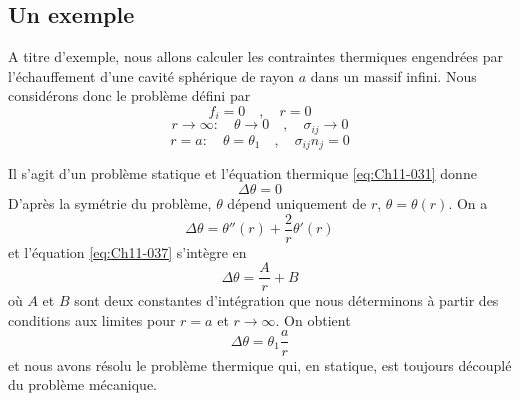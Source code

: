 \subsection{Un exemple}\label{ssec:Ch11-2.2}
A titre d'exemple, nous allons calculer les contraintes thermiques engendrées par l'échauffement d'une cavité sphérique de rayon $a$ dans un mas­sif infini. Nous considérons donc le problème défini par 
\begin{equation}
    f_i = 0 \quad,\quad r=0
    \label{eq:Ch11-034}
\end{equation}
\begin{equation}
    r \rightarrow \infty: \quad \theta \rightarrow 0 \quad,\quad \sigma_{ij}\rightarrow 0
    \label{eq:Ch11-035}
\end{equation}
\begin{equation}
    r =a: \quad \theta=\theta_1 \quad,\quad \sigma_{ij}n_j = 0
    \label{eq:Ch11-036}
\end{equation}

Il s'agit d'un problème statique et l'équation thermique \eqref{eq:Ch11-031} donne 
\begin{equation}
    \Delta \theta = 0
    \label{eq:Ch11-037}
\end{equation}
D'après la symétrie du problème, $\theta$ dépend uniquement de $r$, $\theta=\theta(r)$. On a 
\begin{equation}
    \Delta \theta = \theta''(r) +\frac{2}{r}\theta'(r)
    \label{eq:Ch11-038}
\end{equation}
et l'équation \eqref{eq:Ch11-037} s'intègre en 
\begin{equation}
    \Delta \theta = \frac{A}{r} + B
    \label{eq:Ch11-039}
\end{equation}
où $A$ et $B$ sont deux constantes d'intégration que nous déterminons à partir des conditions aux limites pour $r= a$ et $r \rightarrow \infty$. On obtient 
\begin{equation}
    \Delta \theta = \theta_1\frac{a}{r}
    \label{eq:Ch11-040}
\end{equation}
et nous avons résolu le problème thermique qui, en statique, est toujours dé­couplé du problème mécanique. 

